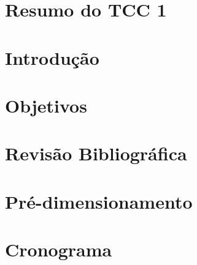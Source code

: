 \documentclass[mestrado, spanish, english, brazil]{packages/icmc}
\begin{document}
\textual

\chapter{Resumo do TCC 1}
\label{resumotcc1}


\chapter{Introdução}
\label{chapter:introducao}


\chapter{Objetivos}
\label{chapter:objetivos}


\chapter{Revisão Bibliográfica}
\label{chapter:revisao-bibliografica}


\chapter{Pré-dimensionamento}
\label{chapter:pre-dimensionamento}


\chapter{Cronograma}
\label{chapter:cronograma}


%


% 

\postextual


\end{document}
